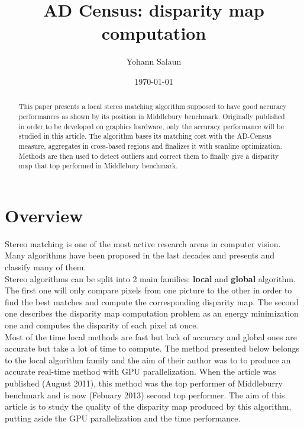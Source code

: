 \documentclass{article}
\title{AD Census: disparity map computation}
\author{Yohann Salaun}
\date{\today}
\begin{document}
\maketitle

\begin{abstract}
This paper presents a local stereo matching algorithm supposed to have good accuracy performances as shown by its position in Middlebury benchmark. Originally published in order to be developed on graphics hardware, only the accuracy performance will be studied in this article. The algorithm bases its matching cost with the AD-Census measure, aggregates in cross-based regions and finalizes it with scanline optimization. Methods are then used to detect outliers and correct them to finally give a disparity map that top performed in Middlebury benchmark.
\end{abstract} 

\section{Overview}

Stereo matching is one of the most active research areas in computer vision. Many algorithms have been proposed in the last decades and  \cite{stereoTaxonomy} presents and classify many of them.\\
Stereo algorithms can be split into 2 main families: \textbf{local} and \textbf{global} algorithm. The first one will only compare pixels from one picture to the other in order to find the best matches and compute the corresponding disparity map. The second one describes the disparity map computation problem as an energy minimization one and computes the disparity of each pixel at once.\\
Most of the time local methods are fast but lack of accuracy and global ones are accurate but take a lot of time to compute. The method \cite{adCensus}  presented below belongs to the local algorithm family and the aim of their author was to to produce an accurate real-time method with GPU parallelization. When the article was published (August 2011), this method was the top performer of Middleburry benchmark \cite{middleBench} and is now (Febuary 2013) second top performer. The aim of this article is to study the quality of the disparity map produced by this algorithm, putting aside the GPU parallelization and the time performance.
\end{document}
